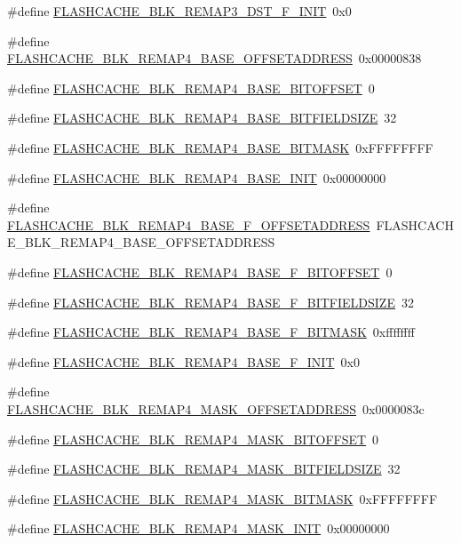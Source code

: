 \begin{DoxyCompactItemize}
\#define \hyperlink{a00550_a2ea473da6300a0b88fca173da50c6bf3}{FLASHCACHE\_\-BLK\_\-REMAP3\_\-DST\_\-F\_\-INIT}~0x0
\item 
\#define \hyperlink{a00550_a69bf18576e8545074efdf92d54011b4b}{FLASHCACHE\_\-BLK\_\-REMAP4\_\-BASE\_\-OFFSETADDRESS}~0x00000838
\item 
\#define \hyperlink{a00550_a40eaa1b90f92110cdc17eeb1186e6d96}{FLASHCACHE\_\-BLK\_\-REMAP4\_\-BASE\_\-BITOFFSET}~0
\item 
\#define \hyperlink{a00550_a9a27664529750dc53e1862739bbe715a}{FLASHCACHE\_\-BLK\_\-REMAP4\_\-BASE\_\-BITFIELDSIZE}~32
\item 
\#define \hyperlink{a00550_a5983ceda16b194a973a43fc81ccdee4b}{FLASHCACHE\_\-BLK\_\-REMAP4\_\-BASE\_\-BITMASK}~0xFFFFFFFF
\item 
\#define \hyperlink{a00550_a814f99416018f652b34a6828aaecf559}{FLASHCACHE\_\-BLK\_\-REMAP4\_\-BASE\_\-INIT}~0x00000000
\item 
\#define \hyperlink{a00550_a02567faeafd338de02483efdef9bdccf}{FLASHCACHE\_\-BLK\_\-REMAP4\_\-BASE\_\-F\_\-OFFSETADDRESS}~FLASHCACHE\_\-BLK\_\-REMAP4\_\-BASE\_\-OFFSETADDRESS
\item 
\#define \hyperlink{a00550_a76cb16f0c438450474470ce929bd897f}{FLASHCACHE\_\-BLK\_\-REMAP4\_\-BASE\_\-F\_\-BITOFFSET}~0
\item 
\#define \hyperlink{a00550_a447a12c8800094c5b7a94078e826b82f}{FLASHCACHE\_\-BLK\_\-REMAP4\_\-BASE\_\-F\_\-BITFIELDSIZE}~32
\item 
\#define \hyperlink{a00550_a7732382be2afac91e1b3abe8fb158fb7}{FLASHCACHE\_\-BLK\_\-REMAP4\_\-BASE\_\-F\_\-BITMASK}~0xffffffff
\item 
\#define \hyperlink{a00550_a671583f7db25f6be7f7415381f7498d6}{FLASHCACHE\_\-BLK\_\-REMAP4\_\-BASE\_\-F\_\-INIT}~0x0
\item 
\#define \hyperlink{a00550_a67c652b25a8189c0ce6d0855f62b23b7}{FLASHCACHE\_\-BLK\_\-REMAP4\_\-MASK\_\-OFFSETADDRESS}~0x0000083c
\item 
\#define \hyperlink{a00550_afdeb8e17c92c152d77abd9c7d44056f6}{FLASHCACHE\_\-BLK\_\-REMAP4\_\-MASK\_\-BITOFFSET}~0
\item 
\#define \hyperlink{a00550_a78d81358776e197b7b411514cb1ee2aa}{FLASHCACHE\_\-BLK\_\-REMAP4\_\-MASK\_\-BITFIELDSIZE}~32
\item 
\#define \hyperlink{a00550_a56e3b1ebd65432b185076b8f472f2ae8}{FLASHCACHE\_\-BLK\_\-REMAP4\_\-MASK\_\-BITMASK}~0xFFFFFFFF
\item 
\#define \hyperlink{a00550_ac121ee2659fa50ec83bf919b32f3f5c6}{FLASHCACHE\_\-BLK\_\-REMAP4\_\-MASK\_\-INIT}~0x00000000

\end{DoxyCompactItemize}
